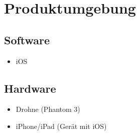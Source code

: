 


\chapter{Produktumgebung}\label{cha:Produktumgebung}
 
\section{Software}\label{sec:Software}
\begin{itemize}
	\item iOS		
\end{itemize}


\section{Hardware}\label{sec:Hardware}
\begin{itemize}
	\item Drohne (Phantom 3)
	\item iPhone/iPad (Gerät mit iOS)		
\end{itemize}